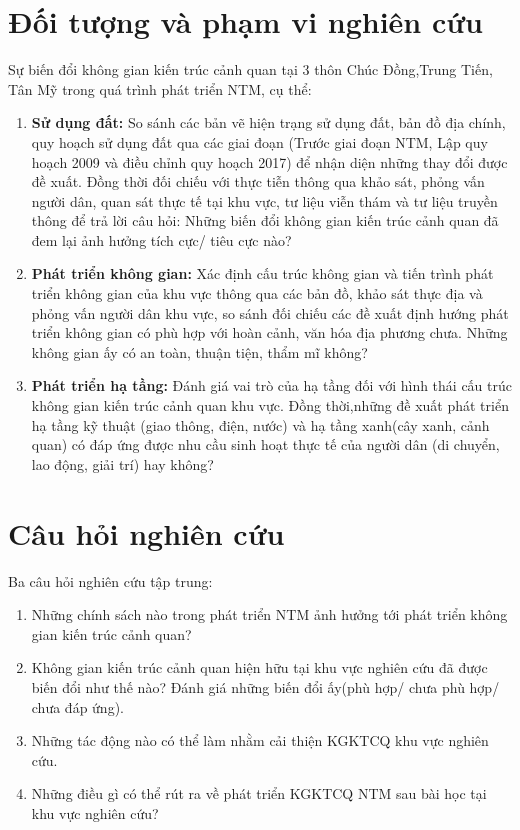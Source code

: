 \documentclass[../thesis.tex]{subfiles}
\begin{document}
\section{Đối tượng và phạm vi nghiên cứu}
Sự biến đổi không gian kiến trúc cảnh quan tại 3 thôn Chúc Đồng,Trung Tiến, Tân Mỹ trong quá trình phát triển NTM, cụ thể:
\begin{enumerate}
    \item \textbf{Sử dụng đất:} So sánh các bản vẽ hiện trạng sử dụng đất, bản đồ địa chính, quy hoạch sử dụng đất qua các giai đoạn (Trước giai đoạn NTM, Lập quy hoạch 2009 và điều chỉnh quy hoạch 2017) để nhận diện những thay đổi được đề xuất. Đồng thời đối chiếu với thực tiễn thông qua khảo sát, phỏng vấn người dân, quan sát thực tế tại khu vực, tư liệu viễn thám và tư liệu truyền thông để trả lời câu hỏi: Những biến đổi không gian kiến trúc cảnh quan đã đem lại ảnh hưởng tích cực/ tiêu cực nào?
    \item \textbf{Phát triển không gian:} Xác định cấu trúc không gian và tiến trình phát triển không gian của khu vực thông qua các bản đồ, khảo sát thực địa và phỏng vấn người dân khu vực, so sánh đối chiếu các đề xuất định hướng phát triển không gian có phù hợp với hoàn cảnh, văn hóa địa phương chưa. Những không gian ấy có an toàn, thuận tiện, thẩm mĩ không?
    \item \textbf{Phát triển hạ tầng:} Đánh giá vai trò của hạ tầng đối với hình thái cấu trúc không gian kiến trúc cảnh quan khu vực. Đồng thời,những đề xuất phát triển hạ tầng kỹ thuật (giao thông, điện, nước) và hạ tầng xanh(cây xanh, cảnh quan) có đáp ứng được nhu cầu sinh hoạt thực tế của người dân (di chuyển, lao động, giải trí) hay không?
\end{enumerate}
\section{Câu hỏi nghiên cứu}
Ba câu hỏi nghiên cứu tập trung:
\begin{enumerate}
    \item Những chính sách nào trong phát triển NTM ảnh hưởng tới phát triển không gian kiến trúc cảnh quan?
    \item Không gian kiến trúc cảnh quan hiện hữu tại khu vực nghiên cứu đã được biến đổi như thế nào? Đánh giá những biến đổi ấy(phù hợp/ chưa phù hợp/ chưa đáp ứng).
    \item Những tác động nào có thể làm nhằm cải thiện KGKTCQ khu vực nghiên cứu.
    \item Những điều gì có thể rút ra về phát triển KGKTCQ NTM sau bài học tại khu vực nghiên cứu?
\end{enumerate}
\end{document}
